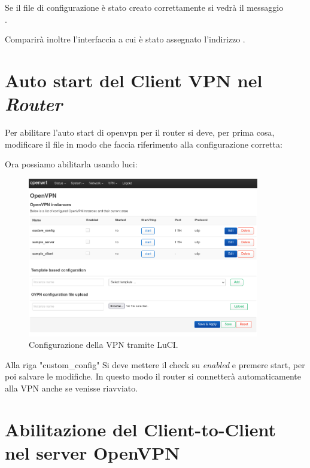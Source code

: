 Se il file di configurazione è stato creato correttamente si vedrà il messaggio \\.

Comparirà inoltre l'interfaccia  a cui è stato assegnato l'indirizzo .

\section{Auto start del Client VPN nel \textit{Router}}

Per abilitare l'auto start di openvpn per il router si deve, per prima cosa, modificare il file  in modo che faccia riferimento alla configurazione corretta:


Ora possiamo abilitarla usando luci:

\begin{figure}[H]
    \centering
    \includegraphics[width=0.9\textwidth]{immagini/LuCI_vpn1}
    \caption{Configurazione della VPN tramite LuCI.}
    \label{fig:luci-vpn}
\end{figure}

Alla riga "custom\_config" Si deve mettere il check su \textit{enabled} e premere start, per poi salvare le modifiche. In questo modo il router si connetterà automaticamente alla VPN anche se venisse riavviato.


\section{Abilitazione del Client-to-Client nel server OpenVPN}

